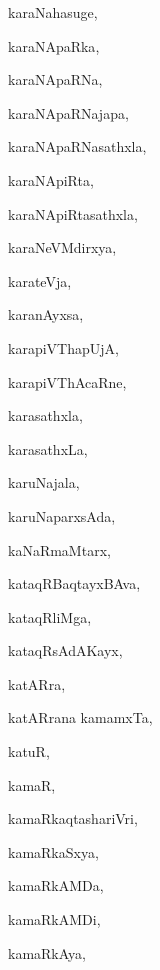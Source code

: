 \begin{multicols}{3}
{\noindent
{karaNahasuge}, \pageref{karaNahasuge}

\noindent
{karaNApaRka}, \pageref{karaNApaRka}

\noindent
{karaNApaRNa}, \pageref{karaNApaRNa}

\noindent
{karaNApaRNajapa}, \pageref{karaNApaRNajapa}

\noindent
{karaNApaRNasathxla}, \pageref{karaNApaRNasathxla}

\noindent
{karaNApiRta}, \pageref{karaNApiRta}

\noindent
{karaNApiRtasathxla}, \pageref{karaNApiRtasathxla}

\noindent
{karaNeVMdirxya}, \pageref{karaNeVMdirxya}

\noindent
{karateVja}, \pageref{karateVja}

\noindent
{karanAyxsa}, \pageref{karanAyxsa}

\noindent
{karapiVThapUjA}, \pageref{karapiVThapUjA}

\noindent
{karapiVThAcaRne}, \pageref{karapiVThAcaRne}

\noindent
{karasathxla}, \pageref{karasathxla}

\noindent
{karasathxLa}, \pageref{karasathxLa}

\noindent
{karuNajala}, \pageref{karuNajala}

\noindent
{karuNaparxsAda}, \pageref{karuNaparxsAda}

\noindent
{kaNaRmaMtarx}, \pageref{kaNaRmaMtarx}

\noindent
{kataqRBaqtayxBAva}, \pageref{kataqRBaqtayxBAva}

\noindent
{kataqRliMga}, \pageref{kataqRliMga}

\noindent
{kataqRsAdAKayx}, \pageref{kataqRsAdAKayx}

\noindent
{katARra}, \pageref{katARra}

\noindent
{katARrana kamamxTa}, \pageref{katARrana kamamxTa-1}

\noindent
{katuR}, \pageref{katuR}

\noindent
{kamaR}, \pageref{kamaR}

\noindent
{kamaRkaqtashariVri}, \pageref{kamaRkaqtashariVri}

\noindent
{kamaRkaSxya}, \pageref{kamaRkaSxya}

\noindent
{kamaRkAMDa}, \pageref{kamaRkAMDa}

\noindent
{kamaRkAMDi}, \pageref{kamaRkAMDi}

\noindent
{kamaRkAya}, \pageref{kamaRkAya}

}
\end{multicols}
